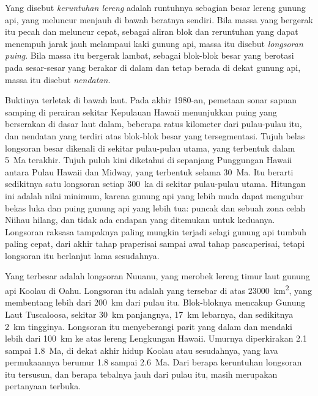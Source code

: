 \begin{definition}\label{def:b2:oceanic-islands:collapse}
Yang disebut \emph{keruntuhan lereng} adalah runtuhnya sebagian besar lereng
gunung api, yang meluncur menjauh di bawah beratnya sendiri. Bila massa yang bergerak itu pecah dan meluncur
cepat, sebagai aliran blok dan reruntuhan yang dapat menempuh jarak jauh melampaui kaki gunung api, massa itu disebut
\emph{longsoran puing}. Bila massa itu bergerak lambat, sebagai blok-blok besar yang berotasi
pada sesar-sesar yang berakar di  dalam dan tetap berada di dekat gunung api, massa itu disebut \emph{nendatan}.
\end{definition}

Buktinya terletak di bawah laut. Pada akhir 1980-an, pemetaan sonar sapuan samping di perairan sekitar
Kepulauan Hawaii menunjukkan puing yang berserakan di dasar laut dalam, beberapa ratus kilometer dari
pulau-pulau itu, dan nendatan yang terdiri atas blok-blok besar yang tersegmentasi. Tujuh belas longsoran besar dikenali
di sekitar pulau-pulau utama, yang terbentuk dalam \qty{5}{Ma} terakhir. Tujuh puluh kini diketahui di sepanjang
Punggungan Hawaii antara Pulau Hawaii dan Midway, yang terbentuk selama \qty{30}{Ma}. Itu berarti sedikitnya
satu longsoran setiap \qty{300}{ka} di sekitar pulau-pulau utama. Hitungan ini adalah nilai minimum, karena
gunung api yang lebih muda dapat mengubur bekas luka dan puing gunung api yang lebih tua:  puncak dan sebuah zona celah
Niihau hilang, dan tidak ada endapan yang ditemukan untuk keduanya. Longsoran raksasa tampaknya paling mungkin terjadi selagi
gunung api tumbuh paling cepat, dari akhir tahap praperisai sampai awal tahap pascaperisai, tetapi longsoran itu berlanjut
lama sesudahnya.

Yang terbesar adalah longsoran Nuuanu, yang merobek lereng timur laut gunung api Koolau
di Oahu. Longsoran itu adalah  yang tersebar di atas \qty{23000}{km^2}, yang membentang lebih dari
\qty{200}{km} dari pulau itu. Blok-bloknya mencakup Gunung Laut Tuscaloosa, sekitar \qty{30}{km} panjangnya,
\qty{17}{km} lebarnya, dan sedikitnya \qty{2}{km} tingginya. Longsoran itu menyeberangi parit yang dalam dan mendaki
lebih dari \qty{100}{km} ke atas lereng Lengkungan Hawaii. Umurnya diperkirakan 2.1 sampai
\qty{1.8}{Ma}, di dekat akhir hidup Koolau atau sesudahnya, yang lava permukaannya berumur 1.8 sampai
\qty{2.6}{Ma}. Dari berapa keruntuhan longsoran itu tersusun, dan berapa tebalnya jauh dari pulau itu,
masih merupakan pertanyaan terbuka.

